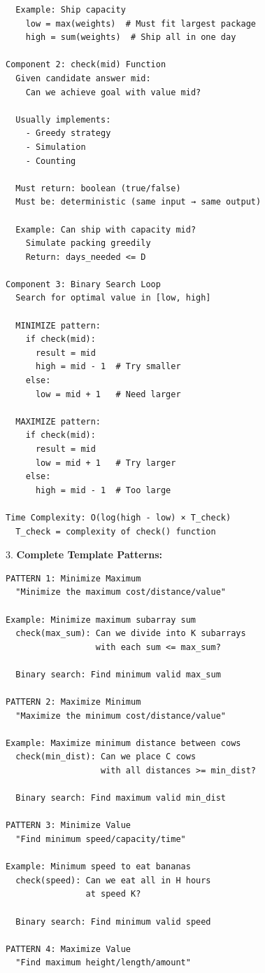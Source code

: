 \documentclass[11pt,a4paper,oneside]{book}
\begin{document}
\begin{tcolorbox}[
    enhanced,breakable,
    colback=white,
    colframe=deepblue,
    boxrule=1.5pt,
    arc=3mm,
    title=\textbf{The BSOA Paradigm: A Complete Revolution}
]
\begin{verbatim}
  Example: Ship capacity
    low = max(weights)  # Must fit largest package
    high = sum(weights)  # Ship all in one day

Component 2: check(mid) Function
  Given candidate answer mid:
    Can we achieve goal with value mid?
  
  Usually implements:
    - Greedy strategy
    - Simulation
    - Counting
  
  Must return: boolean (true/false)
  Must be: deterministic (same input → same output)
  
  Example: Can ship with capacity mid?
    Simulate packing greedily
    Return: days_needed <= D

Component 3: Binary Search Loop
  Search for optimal value in [low, high]
  
  MINIMIZE pattern:
    if check(mid):
      result = mid
      high = mid - 1  # Try smaller
    else:
      low = mid + 1   # Need larger
  
  MAXIMIZE pattern:
    if check(mid):
      result = mid
      low = mid + 1   # Try larger
    else:
      high = mid - 1  # Too large

Time Complexity: O(log(high - low) × T_check)
  T_check = complexity of check() function
\end{verbatim}

3. \textbf{Complete Template Patterns:}
\begin{verbatim}
PATTERN 1: Minimize Maximum
  "Minimize the maximum cost/distance/value"

Example: Minimize maximum subarray sum
  check(max_sum): Can we divide into K subarrays
                  with each sum <= max_sum?
  
  Binary search: Find minimum valid max_sum

PATTERN 2: Maximize Minimum
  "Maximize the minimum cost/distance/value"

Example: Maximize minimum distance between cows
  check(min_dist): Can we place C cows
                   with all distances >= min_dist?
  
  Binary search: Find maximum valid min_dist

PATTERN 3: Minimize Value
  "Find minimum speed/capacity/time"

Example: Minimum speed to eat bananas
  check(speed): Can we eat all in H hours
                at speed K?
  
  Binary search: Find minimum valid speed

PATTERN 4: Maximize Value
  "Find maximum height/length/amount"


\end{verbatim}
\end{tcolorbox}
\end{document}
